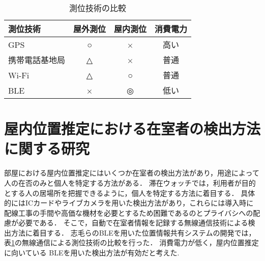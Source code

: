 \begin{table}[htb]
  \begin{center}
    \caption{測位技術の比較}
    \label{tb:positioning}
    \begin{tabular}{|l|c|c|c|} \hline
      測位技術    & 屋外測位 & 屋内測位 & 消費電力 \\ \hline \hline
      GPS     & ○    & ×    & 高い   \\
      携帯電話基地局 & △    & ×    & 普通   \\
      Wi-Fi   & △    & ○    & 普通   \\
      BLE     & ×    & ◎    & 低い   \\\hline
    \end{tabular}
  \end{center}
\end{table}





 \section{屋内位置推定における在室者の検出方法に関する研究}\label{2.1}
部屋における屋内位置推定にはいくつか在室者の検出方法があり，用途によって人の在否のみと個人を特定する方法がある．
滞在ウォッチでは，利用者が目的とする人の居場所を把握できるように，個人を特定する方法に着目する．
具体的にはICカードやライブカメラを用いた検出方法があり，これらには導入時に配線工事の手間や高価な機材を必要とするため困難であるのとプライバシへの配慮が必要である．
そこで，自動で在室者情報を記録する無線通信技術による検出方法に着目する．
志毛らのBLEを用いた位置情報共有システムの開発\cite{communication}では，
表\ref{tb:positioning}の無線通信による測位技術の比較を行った．
消費電力が低く，屋内位置推定に向いている BLEを用いた検出方法が有効だと考えた.